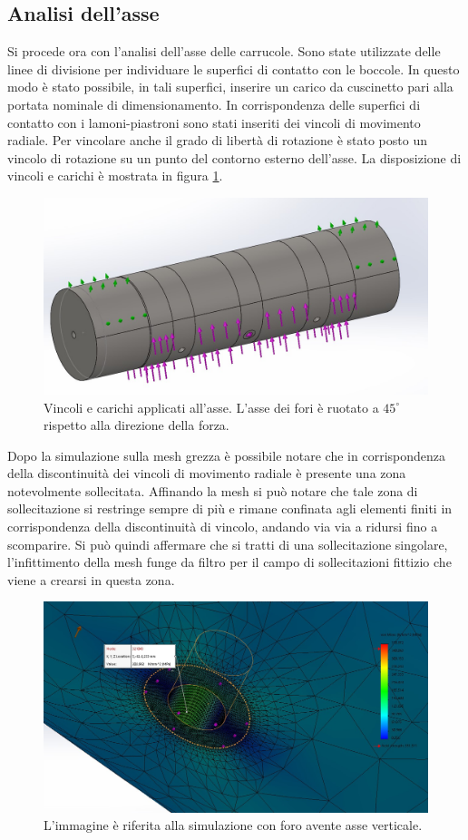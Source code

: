 \subsection{Analisi dell'asse}
Si procede ora con l'analisi dell'asse delle carrucole. Sono state utilizzate delle linee di divisione per individuare le superfici di contatto con le boccole.
In questo modo è stato possibile, in tali superfici, inserire un carico da cuscinetto pari alla portata nominale di dimensionamento. In corrispondenza delle superfici di contatto con i lamoni-piastroni sono stati inseriti dei vincoli di movimento radiale.
Per vincolare anche il grado di libertà di rotazione è stato posto un vincolo di rotazione su un punto del contorno esterno dell'asse.
La disposizione di vincoli e carichi è mostrata in figura \ref{fig:AsseCarico}.
\begin{figure}[H]
\centering
  \includegraphics[width=.65\textwidth]{imgs/fem/AsseCarico}
\caption{Vincoli e carichi applicati all'asse. L'asse dei fori è ruotato a $45^{\circ}$ rispetto alla direzione della forza.}
\label{fig:AsseCarico}
\end{figure}
Dopo la simulazione sulla mesh grezza è possibile notare che in corrispondenza della discontinuità dei vincoli di movimento radiale è presente una zona notevolmente sollecitata. Affinando la mesh si può notare che tale zona di sollecitazione si restringe sempre di più e rimane confinata agli elementi finiti in corrispondenza della discontinuità di vincolo, andando via via a ridursi fino a scomparire.
Si può quindi affermare che si tratti di una sollecitazione singolare, l'infittimento della mesh funge da filtro per il campo di sollecitazioni fittizio che viene a crearsi in questa zona. 
\begin{figure}[H]
\centering
  \includegraphics[width=.65\textwidth]{imgs/fem/AsseSim3}
\caption{L'immagine è riferita alla simulazione con foro avente asse verticale.}
\label{fig:AsseSim3}
\end{figure}
